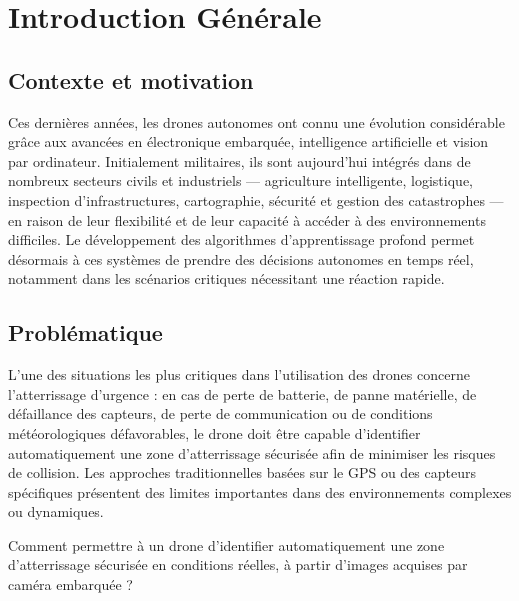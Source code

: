 \chapter*{Introduction Générale}

\section*{Contexte et motivation}

Ces dernières années, les drones autonomes ont connu une évolution considérable grâce aux avancées en électronique embarquée, intelligence artificielle et vision par ordinateur. Initialement militaires, ils sont aujourd'hui intégrés dans de nombreux secteurs civils et industriels — agriculture intelligente, logistique, inspection d'infrastructures, cartographie, sécurité et gestion des catastrophes — en raison de leur flexibilité et de leur capacité à accéder à des environnements difficiles. Le développement des algorithmes d'apprentissage profond permet désormais à ces systèmes de prendre des décisions autonomes en temps réel, notamment dans les scénarios critiques nécessitant une réaction rapide.

\section*{Problématique}

L'une des situations les plus critiques dans l'utilisation des drones concerne l'atterrissage d'urgence : en cas de perte de batterie, de panne matérielle, de défaillance des capteurs, de perte de communication ou de conditions météorologiques défavorables, le drone doit être capable d'identifier automatiquement une zone d'atterrissage sécurisée afin de minimiser les risques de collision. Les approches traditionnelles basées sur le GPS ou des capteurs spécifiques présentent des limites importantes dans des environnements complexes ou dynamiques.

\begin{tcolorbox}[
  colback=ENIADLightBlue!40, colframe=ENIADBlue,
  title={\textbf{Question centrale}}, fonttitle=\bfseries,
  arc=4pt, boxrule=0.8pt
]
Comment permettre à un drone d'identifier automatiquement une zone d'atterrissage sécurisée en conditions réelles, à partir d'images acquises par caméra embarquée ?
\end{tcolorbox}

